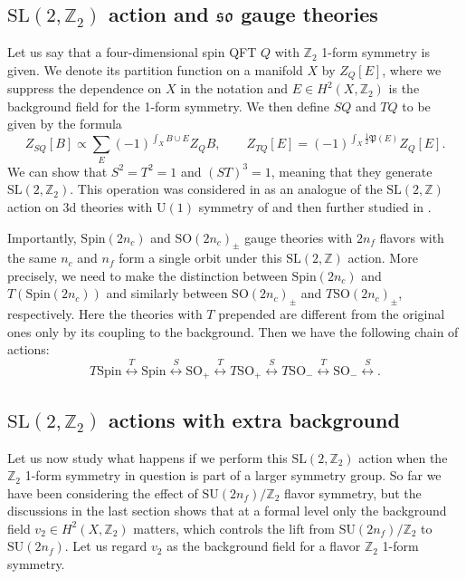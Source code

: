 \documentclass[12pt]{article}
\numberwithin{equation}{section}
\def\bZ{\mathbb{Z}}
\def\fP{\mathfrak{P}}
\def\U{\mathrm{U}}
\def\SU{\mathrm{SU}}
\def\SO{\mathrm{SO}}
\def\so{\mathfrak{so}}
\def\Spin{\mathrm{Spin}}
\def\SL{\mathrm{SL}}
\begin{document}
\subsection{$\SL(2,\bZ_2)$ action and $\so$ gauge theories}

Let us say that  a four-dimensional spin QFT $Q$ with $\bZ_2$ 1-form symmetry is given.
We denote its partition function on a manifold $X$ by $Z_Q[E]$, 
where we suppress the dependence on $X$ in the notation and $E\in H^2(X,\bZ_2)$ is the background field for the 1-form symmetry.
We then define $SQ$ and $TQ$ to be given by the formula \begin{equation}
Z_{SQ}[B] \propto \sum_{E} (-1)^{\int_X B\cup E} Z_Q{B},\qquad
Z_{TQ}[E]= (-1)^{\int_X \tfrac12 \fP(E)} Z_Q[E].
\end{equation}
We can show that $S^2=T^2=1$ and $(ST)^3=1$, meaning that they generate $\SL(2,\bZ_2)$.
This operation was considered in  \cite{Gaiotto:2014kfa} as an analogue of the $\SL(2,\bZ)$ action on 3d theories with $\U(1)$ symmetry of  \cite{Witten:2003ya} and then further studied in \cite{Bhardwaj:2020ymp}.


Importantly, $\Spin(2n_c)$ and $\SO(2n_c)_\pm$  gauge theories with $2n_f$ flavors with the same $n_c$ and $n_f$ form a single orbit under this $\SL(2,\bZ)$ action.
More precisely, we need to make the distinction between $\Spin(2n_c)$ and $T(\Spin(2n_c))$ and  similarly between $\SO(2n_c)_\pm$ and $T\SO(2n_c)_\pm$, respectively.
Here the theories with $T$ prepended are different from the original ones only by its coupling to the background.
Then we have the following chain of actions: \begin{equation}
T\Spin \stackrel{T}{\longleftrightarrow} 
\Spin \stackrel{S}{\longleftrightarrow} 
\SO_+ \stackrel{T}{\longleftrightarrow} 
T\SO_+ \stackrel{S}{\longleftrightarrow} 
T\SO_- \stackrel{T}{\longleftrightarrow} 
\SO_- \stackrel{S}{\longleftrightarrow} .
\end{equation}

\subsection{$\SL(2,\bZ_2)$ actions with extra background}

Let us now study what happens if we perform this $\SL(2,\bZ_2)$ action when the $\bZ_2$ 1-form symmetry in question is part of a larger symmetry group.
So far we have been considering the effect of $\SU(2n_f)/\bZ_2$ flavor symmetry,
but the discussions in the last section shows that at a formal level only the background field $v_2 \in H^2(X,\bZ_2)$ matters, which controls the lift from $\SU(2n_f)/\bZ_2$ to $\SU(2n_f)$.
Let us regard $v_2$ as the background field for a flavor $\bZ_2$ 1-form symmetry.
\end{document}

